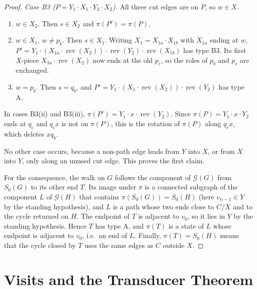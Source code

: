 \documentclass[11pt]{article}
\theoremstyle{definition}
\newcommand{\rev}{\operatorname{rev}}
\newcommand{\cG}{\mathcal{G}}
\begin{document}
\begin{proof}
\emph{Case B3 ($P = Y_1 \cdot X_1 \cdot Y_2 \cdot X_2$).} All three cut edges are on $P$, so
$w \in X$.
\begin{enumerate}
\item[(i)] $w \in X_2$. Then $s \in X_2$ and $\pi(P') = \pi(P)$.
\item[(ii)] $w \in X_1$, $w \ne p_b$. Then $s \in X_1$. Writing $X_1 = X_{1a} \cdot X_{1b}$ with
$X_{1a}$ ending at $w$, $P' = Y_1 \cdot (X_{1a} \cdot \rev(X_2)) \cdot \rev(Y_2) \cdot \rev(X_{1b})$
has type B3. Its first $X$-piece $X_{1a} \cdot \rev(X_2)$ now ends at the old $p_c$, so the roles
of $p_b$ and $p_c$ are exchanged.
\item[(iii)] $w = p_b$. Then $s = q_b$, and $P' = Y_1 \cdot (X_1 \cdot \rev(X_2)) \cdot \rev(Y_2)$
has type A.
\end{enumerate}
In cases B3(ii) and B3(iii), $\pi(P') = Y_1 \cdot x \cdot \rev(Y_2)$. Since
$\pi(P) = Y_1 \cdot x \cdot Y_2$ ends at $q_c$ and $q_c x$ is not on $\pi(P)$, this is the rotation
of $\pi(P)$ along $q_cx$, which deletes $xq_b$.

No other case occurs, because a non-path edge leads from $Y$ into $X$, or from $X$ into $Y$, only
along an unused cut edge. This proves the first claim.

For the consequence, the walk on $G$ follows the component of $\cG(G)$ from $S_0(G)$ to its other
end $T$. Its image under $\pi$ is a connected subgraph of the component $L$ of $\cG(H)$ that
contains $\pi(S_0(G)) = S_0(H)$ (here $v_{n-1} \in Y$ by the standing hypothesis), and $L$ is a path whose two ends close to $C/X$ and to the cycle
returned on $H$. The endpoint of $T$ is adjacent to $v_0$, so it lies in $Y$ by the standing
hypothesis. Hence $T$ has type A, and $\pi(T)$ is a state of $L$ whose endpoint is adjacent to
$v_0$, i.e.\ an end of $L$. Finally, $\pi(T) = S_0(H)$ means that the cycle closed by $T$ uses
the same edges as $C$ outside $X$.
\end{proof}

\section{Visits and the Transducer Theorem}\label{sec:transducer}
\end{document}
